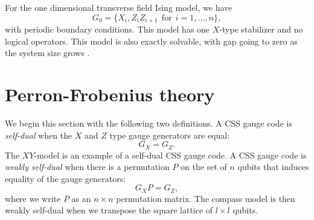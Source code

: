 \documentclass[12pt]{article}
\begin{document}
For the one dimensional transverse field
Ising model, we have 
$$
    G_0 = \{ X_i, Z_i Z_{i+1}\ \ \mbox{for}\ \ i=1,...,n \},
$$
with periodic boundary conditions.
This model has one 
$X$-type stabilizer and no logical operators.
This model is also exactly solvable, with gap going to zero
as the system size grows \cite{Pfeuty1970}.

\section{Perron-Frobenius theory}



We begin this section with the following two definitions.
A CSS gauge code is \emph{self-dual} when the $X$ and $Z$ type
gauge generators are equal: $$G_X = G_Z.$$
The $XY$-model is an example of a self-dual CSS gauge code.
A CSS gauge code is \emph{weakly self-dual}
when there is a permutation $P$ on the set of $n$ qubits
that induces equality of the gauge generators:
$$
    G_X P = G_Z,
$$
where we write $P$ as an $n\times n$ permutation matrix.
The compass model is then weakly self-dual when we transpose
the square lattice of $l\times l$ qubits.
\end{document}
